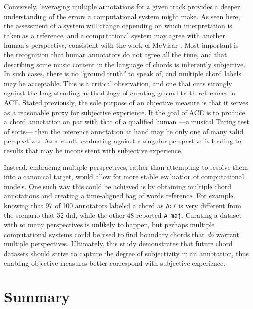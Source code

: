 Conversely, leveraging multiple annotations for a given track provides a deeper understanding of the errors a computational system might make.
As seen here, the assessment of a system will change depending on which interpretation is taken as a reference, and a computational system may agree with another human's perspective, consistent with the work of McVicar \cite{Ni2013Understanding}.
Most important is the recognition that human annotators do not agree all the time, and that describing some music content in the language of chords is inherently subjective.
In such cases, there is no ``ground truth'' to speak of, and multiple chord labels may be acceptable.
This is a critical observation, and one that cuts strongly against the long-standing methodology of curating ground truth references in ACE.
Stated previously, the sole purpose of an objective measure is that it serves as a reasonable proxy for subjective experience.
If the goal of ACE is to produce a chord annotation on par with that of a qualified human ---a musical Turing test of sorts--- then the reference annotation at hand may be only one of many valid perspectives.
As a result, evaluating against a singular perspective is leading to results that may be inconsistent with subjective experience.

Instead, embracing multiple perspectives, rather than attempting to resolve them into a canonical target, would allow for more stable evaluation of computational models.
One such way this could be achieved is by obtaining multiple chord annotations and creating a time-aligned bag of words reference.
For example, knowing that 97 of 100 annotators labeled a chord as \texttt{A:7} is very different from the scenario that 52 did, while the other 48 reported \texttt{A:maj}.
Curating a dataset with so many perspectives is unlikely to happen, but perhaps multiple computational systems could be used to find boundary chords that \emph{do} warrant multiple perspectives.
Ultimately, this study demonstrates that future chord datasets should strive to capture the degree of subjectivity in an annotation, thus enabling objective measures better correspond with subjective experience.


\section{Summary}
\label{sec:summary}

